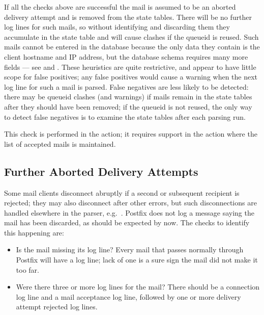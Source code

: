 If all the checks above are successful the mail is assumed to be an aborted
delivery attempt and is removed from the state tables.  There will be no
further log lines for such mails, so without identifying and discarding
them they accumulate in the state table and will cause clashes if the
queueid is reused.  Such mails cannot be entered in the database because
the only data they contain is the client hostname and IP address, but the
database schema requires many more fields --- see  and .  These heuristics are quite
restrictive, and appear to have little scope for false positives; any false
positives would cause a warning when the next log line for such a mail is
parsed.  False negatives are less likely to be detected: there may be
queueid clashes (and warnings) if mails remain in the state tables after
they should have been removed; if the queueid is not reused, the only way
to detect false negatives is to examine the state tables after each parsing
run.

This check is performed in the  action; it requires
support in the  action where the list of accepted mails is
maintained.


\subsection{Further Aborted Delivery Attempts}

Some mail clients disconnect abruptly if a second or subsequent recipient
is rejected; they may also disconnect after other errors, but such
disconnections are handled elsewhere in the parser, e.g.\
.  Postfix does not log a message
saying the mail has been discarded, as should be expected by now.  The
checks to identify this happening are:

\begin{itemize}

    \item Is the mail missing its  log line?  Every mail
        that passes normally through Postfix will have a \daemon{cleanup}
        log line; lack of one is a sure sign the mail did not make it too
        far.

    \item Were there three or more  log lines for the mail?
        There should be a connection log line and a mail acceptance log
        line, followed by one or more delivery attempt rejected log lines.

\end{itemize}

